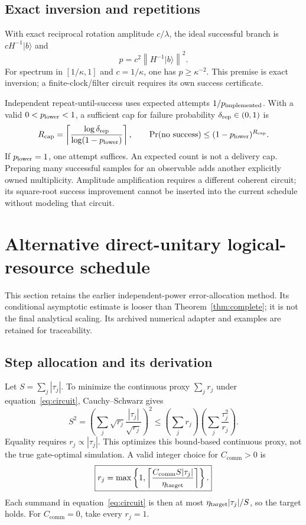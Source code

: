 \documentclass[11pt,a4paper]{article}
\newcommand{\norm}[1]{\left\lVert #1\right\rVert}
\newcommand{\C}{C_{\mathrm{comm}}}
\begin{document}
\subsection{Exact inversion and repetitions}
With exact reciprocal rotation amplitude $c/\lambda$, the ideal successful branch is $cH^{-1}|b\rangle$ and
\begin{equation}
 p=c^2\norm{H^{-1}|b\rangle}^2.
\end{equation}
For spectrum in $[1/\kappa,1]$ and $c=1/\kappa$, one has $p\geq\kappa^{-2}$. This premise is exact inversion; a finite-clock/filter circuit requires its own success certificate.

Independent repeat-until-success uses expected attempts $1/p_{\rm implemented}$. With a valid $0<p_{\rm lower}<1$, a sufficient cap for failure probability $\delta_{\rm rep}\in(0,1)$ is
\begin{equation}\label{eq:reps}
 R_{\rm cap}=\left\lceil\frac{\log\delta_{\rm rep}}{\log(1-p_{\rm lower})}\right\rceil,
 \qquad \Pr(\text{no success})\leq(1-p_{\rm lower})^{R_{\rm cap}}.
\end{equation}
If $p_{\rm lower}=1$, one attempt suffices. An expected count is not a delivery cap. Preparing many successful samples for an observable adds another explicitly owned multiplicity. Amplitude amplification requires a different coherent circuit; its square-root success improvement cannot be inserted into the current schedule without modeling that circuit.

\section{Alternative direct-unitary logical-resource schedule}
This section retains the earlier independent-power error-allocation method. Its conditional asymptotic estimate is looser than Theorem~\ref{thm:complete}; it is not the final analytical scaling. Its archived numerical adapter and examples are retained for traceability.
\subsection{Step allocation and its derivation}
Let $S=\sum_j|\tau_j|$. To minimize the continuous proxy $\sum_jr_j$ under equation~\eqref{eq:circuit}, Cauchy--Schwarz gives
\begin{equation}
 S^2=\left(\sum_j\sqrt{r_j}\frac{|\tau_j|}{\sqrt{r_j}}\right)^2
 \leq\left(\sum_jr_j\right)\left(\sum_j\frac{\tau_j^2}{r_j}\right).
\end{equation}
Equality requires $r_j\propto|\tau_j|$. This optimizes this bound-based continuous proxy, not the true gate-optimal simulation. A valid integer choice for $\C>0$ is
\begin{equation}\label{eq:schedule}
 \boxed{r_j=\max\left\{1,\left\lceil\frac{\C S|\tau_j|}{\eta_{\rm target}}\right\rceil\right\}.}
\end{equation}
Each summand in equation~\eqref{eq:circuit} is then at most $\eta_{\rm target}|\tau_j|/S$, so the target holds. For $\C=0$, take every $r_j=1$.
\end{document}
